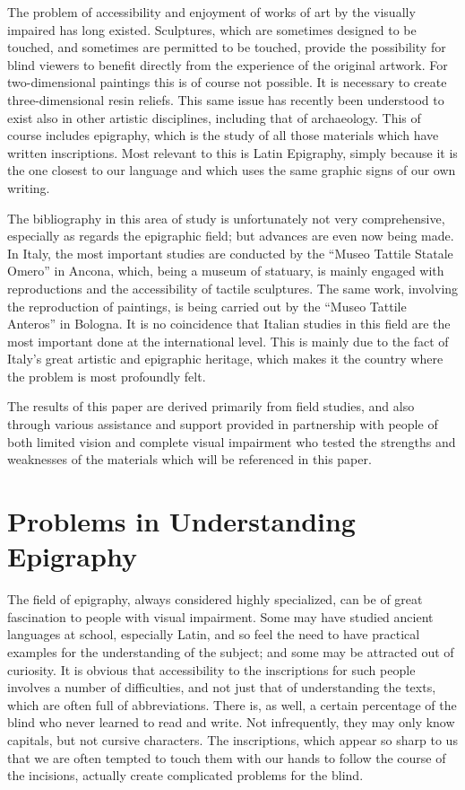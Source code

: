 \documentclass[amsthm,ebook]{saparticle}
\begin{document}
The problem of accessibility and enjoyment of works of art by the visually impaired has long existed. Sculptures, which
are sometimes designed to be touched, and sometimes are permitted to be touched, provide the possibility for blind
viewers to benefit directly from the experience of the original artwork. For two-dimensional paintings this is of
course not possible. It is necessary to create three-dimensional resin reliefs. This same issue has recently been
understood to exist also in other artistic disciplines, including that of archaeology. This of course includes
epigraphy, which is the study of all those materials which have written inscriptions. Most relevant to this is Latin
Epigraphy, simply because it is the one closest to our language and which uses the same graphic signs of our own
writing.

The bibliography in this area of study is unfortunately not very comprehensive, especially as regards the epigraphic
field; but advances are even now being made. In Italy, the most important studies are conducted by the ``Museo Tattile
Statale Omero'' in Ancona, which, being a museum of statuary, is mainly engaged with reproductions and the accessibility
of tactile sculptures. The same work, involving the reproduction of paintings, is being carried out by the ``Museo
Tattile Anteros'' in Bologna. It is no coincidence that Italian studies in this field are the most important done at the
international level. This is mainly due to the fact of Italy’s great artistic and epigraphic heritage, which makes it
the country where the problem is most profoundly felt.

The results of this paper are derived primarily from field studies, and also through various assistance and support
provided in partnership with people of both limited vision and complete visual impairment who tested the strengths and
weaknesses of the materials which will be referenced in this paper.







\section{Problems in Understanding Epigraphy}
\noindent The field of epigraphy, always considered highly specialized, can be of great fascination to people with visual
impairment. Some may have studied ancient languages at school, especially Latin, and so feel the need to have practical
examples for the understanding of the subject; and some may be attracted out of curiosity. It is obvious that
accessibility to the inscriptions for such people involves a number of difficulties, and not just that of understanding
the texts, which are often full of abbreviations. There is, as well, a certain percentage of the blind who never
learned to read and write. Not infrequently, they may only know capitals, but not cursive characters. The inscriptions,
which appear so sharp to us that we are often tempted to touch them with our hands to follow the course of the
incisions, actually create complicated problems for the blind.
\end{document}
